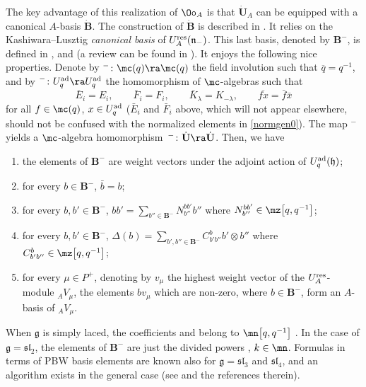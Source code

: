 The key advantage of this realization of $\Oo_A$ is that $\dot{\mathbf{U}}_A$ can be equipped with a canonical $A$-basis $\dot{\mathbf{B}}$. The construction of $\dot{\mathbf{B}}$ is described in \cite[Chapter~25]{Lusztig}. It relies on the Kashiwara--Lusztig {\it canonical basis} of $U_A^{\rm res}(\mathfrak{n}_-)$. This last basis, denoted by $\mathbf{B}^-$, is defined in \cite[Chapter~14]{Lusztig}, and \cite{Kashiwara1} (a review can be found in \cite[Chapter~14]{CP}). It enjoys the following nice properties. Denote by ${}^-\colon \mc(q) \ra \mc(q)$ the field involution such that $\overline{q} = q^{-1}$, and by ${}^-\colon U_q^{\rm ad} \ra U_q^{\rm ad}$ the homomorphism of $\mc$-algebras such that
\[\bar{E}_i = E_i,\qquad \bar{F}_i = F_i,\qquad \bar{K}_\lambda = K_{-\lambda},\qquad \overline{fx} = \bar{f}\bar{x}\]
for all $f\in \mc(q)$, $x\in U_q^{\rm ad}$ ($\bar{E}_i$ and $\bar{F}_i$ above, which will not appear elsewhere, should not be confused with the normalized elements in \eqref{normgen0}). The map ${}^-$ yields a $\mc$-algebra homomorphism~${{}^-\colon \dot{\mathbf{U}} \ra \dot{\mathbf{U}}}$. Then, we have
\begin{enumerate}\itemsep=0pt
\item[(1)] the elements of $\mathbf{B}^-$ are weight vectors under the adjoint action of $U_q^{\rm ad}(\mathfrak{h})$;
\item[(2)] for every $b\in \mathbf{B}^-$, $\bar{b} =b$;
\item[(3)] for every $b,b'\in \mathbf{B}^-$, $bb' = \sum_{b''\in \mathbf{B}^-} N^{bb'}_{b''} b''$ where $N^{bb'}_{b''}\in \mz\big[q,q^{-1}\big]$;
\item[(4)] for every $b,b'\in \mathbf{B}^-$, $\Delta(b) = \sum_{b',b''\in \mathbf{B}^-} C_{b'b''}^b b' \otimes b''$ where $C_{b'b''}^{b}\in \mz\big[q,q^{-1}\big]$;
\item[(5)] for every $\mu\in P^+$, denoting by $v_\mu$ the highest weight vector of the $U_A^{\rm res}$-module ${}_AV_\mu$, the elements $bv_\mu$ which are non-zero, where $b\in \mathbf{B}^-$, form an $A$-basis of ${}_AV_\mu$.
\end{enumerate}
When $\mathfrak{g}$ is simply laced, the coefficients  and  belong to $\mn\big[q,q^{-1}\big]$ \cite[Theorem~14.3.13]{Lusztig}. In the case of $\mathfrak{g}={\mathfrak{sl}_2}$, the elements of $\mathbf{B}^-$ are just the divided powers , $k\in \mn$. Formulas in terms of PBW basis elements are known also for $\mathfrak{g}=\mathfrak{sl}_3$ and $\mathfrak{sl}_4$, and an algorithm exists in the general case (see \cite{deGraaf} and the references therein).


